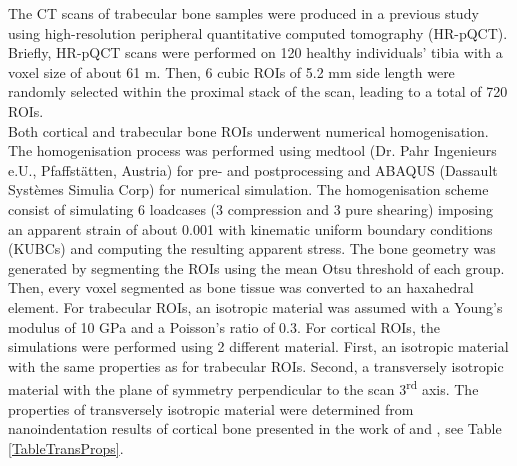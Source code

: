 \documentclass[a4paper,fleqn]{DC_ArtStyle}
\begin{document}
	The CT scans of trabecular bone samples were produced in a previous study \cite{Simon2021FabricelasticityRO} using high-resolution peripheral quantitative computed tomography (HR-pQCT).
	Briefly, HR-pQCT scans were performed on 120 healthy individuals' tibia with a voxel size of about 61 \textmu m.
	Then, 6 cubic ROIs of 5.2 mm side length were randomly selected within the proximal stack of the scan, leading to a total of 720 ROIs.\\

	Both cortical and trabecular bone ROIs underwent numerical homogenisation.
	The homogenisation process was performed using medtool (Dr. Pahr Ingenieurs e.U., Pfaffstätten, Austria) for pre- and postprocessing and ABAQUS (Dassault Syst{\`e}mes Simulia Corp) for numerical simulation.
	The homogenisation scheme consist of simulating 6 loadcases (3 compression and 3 pure shearing) imposing an apparent strain of about 0.001 with kinematic uniform boundary conditions (KUBCs) and computing the resulting apparent stress.
	The bone geometry was generated by segmenting the ROIs using the mean Otsu threshold of each group.
	Then, every voxel segmented as bone tissue was converted to an haxahedral element.
	For trabecular ROIs, an isotropic material was assumed with a Young's modulus of 10 GPa and a Poisson's ratio of 0.3.
	For cortical ROIs, the simulations were performed using 2 different material.
	First, an isotropic material with the same properties as for trabecular ROIs.
	Second, a transversely isotropic material with the plane of symmetry perpendicular to the scan 3\textsuperscript{rd} axis.
	The properties of transversely isotropic material were determined from nanoindentation results of cortical bone presented in the work of \citeauthor{Franzoso2009ElasticAO}\cite{Franzoso2009ElasticAO} and \citeauthor{DallAra2012MicroindentationCD}\cite{DallAra2012MicroindentationCD}, see Table \ref{TableTransProps}.

	\begin{table}
		\caption{Nanoindentation - cortical bone matrix properties}
		\label{TableTransProps}
	\end{table}
\end{document}
